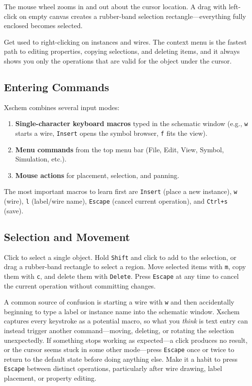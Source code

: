 \documentclass[11pt]{article}
\begin{document}
The mouse wheel zooms in and out about the cursor location.
A drag with left-click on empty canvas creates a rubber-band selection
rectangle---everything fully enclosed becomes selected.

\begin{tipbox}
Get used to right-clicking on instances and wires.
The context menu is the fastest path to editing properties, copying
selections, and deleting items, and it always shows you only the
operations that are valid for the object under the cursor.
\end{tipbox}

\subsection{Entering Commands}

Xschem combines several input modes:

\begin{enumerate}[leftmargin=2em]
  \item \textbf{Single-character keyboard macros} typed in the
        schematic window (e.g., \texttt{w} starts a wire,
        \texttt{Insert} opens the symbol browser, \texttt{f} fits the
        view).
  \item \textbf{Menu commands} from the top menu bar (File, Edit, View,
        Symbol, Simulation, etc.).
  \item \textbf{Mouse actions} for placement, selection, and panning.
\end{enumerate}

The most important macros to learn first are \texttt{Insert} (place a
new instance), \texttt{w} (wire), \texttt{l} (label/wire name),
\texttt{Escape} (cancel current operation), and \texttt{Ctrl+s} (save).

\subsection{Selection and Movement}

Click to select a single object.
Hold \texttt{Shift} and click to add to the selection, or drag a
rubber-band rectangle to select a region.
Move selected items with \texttt{m}, copy them with \texttt{c}, and
delete them with \texttt{Delete}.
Press \texttt{Escape} at any time to cancel the current operation
without committing changes.
\clearpage

\begin{warnbox}
A common source of confusion is starting a wire with \texttt{w} and
then accidentally beginning to type a label or instance name into the
schematic window.
Xschem captures every keystroke as a potential macro, so what you
\emph{think} is text entry can instead trigger another command---moving,
deleting, or rotating the selection unexpectedly.
If something stops working as expected---a click produces no result, or
the cursor seems stuck in some other mode---press \texttt{Escape} once
or twice to return to the default state before doing anything else.
Make it a habit to press \texttt{Escape} between distinct operations,
particularly after wire drawing, label placement, or property editing.
\end{warnbox}
\end{document}
